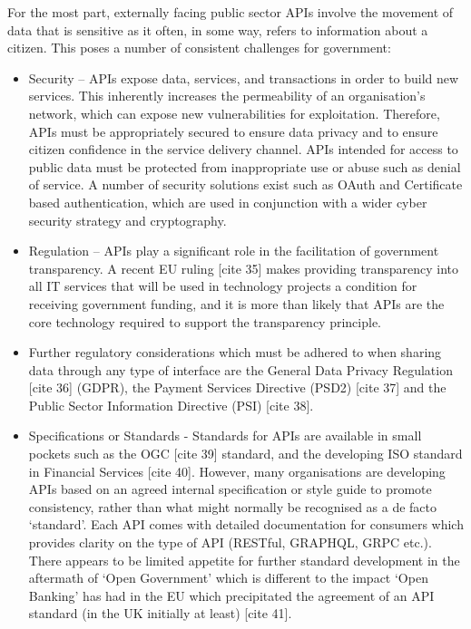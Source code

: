 For the most part, externally facing public sector APIs involve the movement
of data that is sensitive as it often, in some way, refers to information about
a citizen. This poses a number of consistent challenges for government:
\begin{itemize}
	\item Security – APIs expose data, services, and transactions in order to
	build new services. This inherently increases the permeability of an
	organisation’s network, which can expose new vulnerabilities for
	exploitation. Therefore, APIs must be appropriately secured to ensure data
	privacy and to ensure citizen confidence in the service delivery channel.
	APIs intended for access to public data must be protected from inappropriate
	use or abuse such as denial of service. A number of security solutions exist
	such as OAuth and Certificate based authentication, which are used in
	conjunction with a wider cyber security strategy and cryptography.
	\item Regulation – APIs play a significant role in the facilitation of
	government transparency. A recent EU ruling [cite 35] makes providing
	transparency into all IT services that will be used in technology projects
	a condition for receiving government funding, and it is more than likely
	that APIs are the core technology required to support the transparency
	principle.
	\item Further regulatory considerations which must be adhered to when
	sharing data through any type of interface are the General Data Privacy
	Regulation [cite 36] (GDPR), the Payment Services Directive	(PSD2) [cite 37]
	and the Public Sector Information Directive (PSI) [cite 38].
	\item Specifications or Standards - Standards for APIs are available in
	small pockets such as the OGC [cite 39]	standard, and the developing ISO
	standard in Financial Services [cite 40]. However, many organisations are developing
	APIs based on an agreed internal specification or style guide to promote
	consistency, rather than what might normally be recognised as a de facto
	‘standard’. Each API comes with detailed documentation for consumers which
	provides clarity on the type of API	(RESTful, GRAPHQL, GRPC etc.). There
	appears to be limited appetite for further standard	development in the
	aftermath of ‘Open Government’ which is different to the impact ‘Open Banking’
	has had in the EU which precipitated the agreement of an API standard (in the
	UK initially at least) [cite 41].
\end{itemize}

